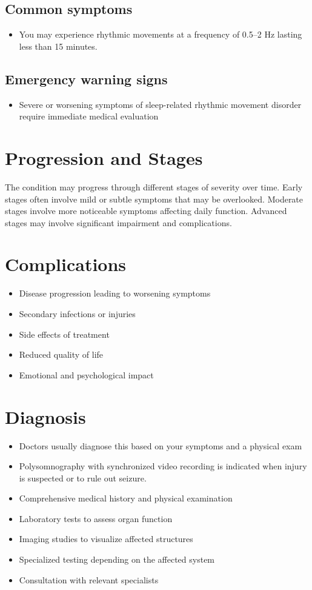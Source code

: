 \subsection{Common symptoms}
\begin{itemize}[noitemsep]
  \item You may experience rhythmic movements at a frequency of 0.5--2 Hz lasting less than 15 minutes. 
  \end{itemize}

\subsection{Emergency warning signs}
\begin{itemize}[noitemsep]
  \item Severe or worsening symptoms of sleep-related rhythmic movement disorder require immediate medical evaluation
\end{itemize}
\section{Progression and Stages}
The condition may progress through different stages of severity over time. Early stages often involve mild or subtle symptoms that may be overlooked. Moderate stages involve more noticeable symptoms affecting daily function. Advanced stages may involve significant impairment and complications.
\section{Complications}
\begin{itemize}[noitemsep]
  \item Disease progression leading to worsening symptoms
  \item Secondary infections or injuries
  \item Side effects of treatment
  \item Reduced quality of life
  \item Emotional and psychological impact
\end{itemize}
\section{Diagnosis}
\begin{itemize}[noitemsep]
  \item Doctors usually diagnose this based on your symptoms and a physical exam
  \item Polysomnography with synchronized video recording is indicated when injury is suspected or to rule out seizure.
  \item Comprehensive medical history and physical examination
  \item Laboratory tests to assess organ function
  \item Imaging studies to visualize affected structures
  \item Specialized testing depending on the affected system
  \item Consultation with relevant specialists
\end{itemize}
